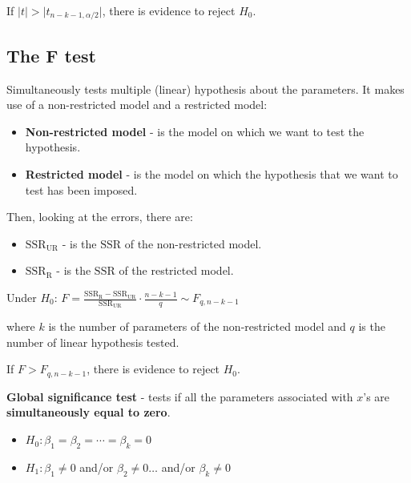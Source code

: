 \documentclass[10pt, a4paper, landscape]{article}
\newcommand{\SSR}{\text{SSR}}
\begin{document}
\begin{multicols}{3}
If \( \lvert t \rvert > \lvert t_{n - k - 1, \alpha / 2} \rvert \), there is evidence to reject \( H_{0} \).

\subsection*{The F test}

Simultaneously tests multiple (linear) hypothesis about the parameters. It makes use of a non-restricted model and a restricted model:

\begin{itemize}[leftmargin=*]
	\item \textbf{Non-restricted model} - is the model on which we want to test the hypothesis.
	\item \textbf{Restricted model} - is the model on which the hypothesis that we want to test has been imposed.
\end{itemize}

Then, looking at the errors, there are:

\begin{itemize}[leftmargin=*]
	\item \textbf{\( \SSR_{\text{UR}} \)} - is the \( \SSR \) of the non-restricted model.
	\item \textbf{\( \SSR_{\text{R}} \)} - is the \( \SSR \) of the restricted model.
\end{itemize}

\begin{center}
	Under \( H_{0} \): \quad \( F = \frac{\SSR_{\text{R}} - \SSR_{\text{UR}}}{\SSR_{\text{UR}}} \cdot \frac{n - k - 1}{q} \sim F_{q, n - k - 1} \)
\end{center}

where \( k \) is the number of parameters of the non-restricted model and \( q \) is the number of linear hypothesis tested.

If \( F > F_{q, n - k - 1} \), there is evidence to reject \( H_{0} \).

\textbf{Global significance test} - tests if all the parameters associated with \( x \)'s are \textbf{simultaneously equal to zero}.

\begin{itemize}[leftmargin=*]
	\item \( H_{0}: \beta_{1} = \beta_{2} = \cdots = \beta_{k} = 0 \)
	\item \( H_{1}: \beta_{1} \neq 0 \) and/or \( \beta_{2} \neq 0 \ldots \) and/or \( \beta_{k} \neq 0 \)
\end{itemize}


\end{multicols}
\end{document}
